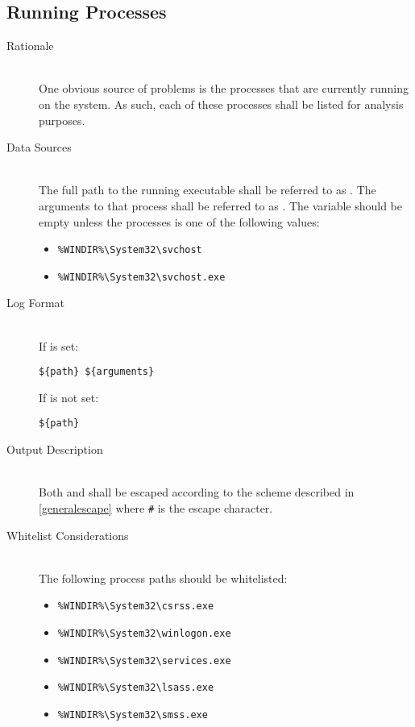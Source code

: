 \subsection{Running Processes}
\begin{description}
\item[Rationale] \hfill \\
One obvious source of problems is the processes that are currently running on
the system.  As such, each of these processes shall be listed for analysis
purposes.  
\item[Data Sources] \hfill \\
The full path to the running executable shall be referred to as .  The
arguments to that process shall be referred to as .  The
 variable should be empty unless the processes is one of the
following values:
\begin{itemize}
  \item \verb|%WINDIR%\System32\svchost|
  \item \verb|%WINDIR%\System32\svchost.exe|
\end{itemize}
\item[Log Format] \hfill \\
If  is set:
\vspace{-\baselineskip}
\begin{verbatim}
${path} ${arguments}
\end{verbatim}
If  is not set:
\vspace{-\baselineskip}
\begin{verbatim}
${path} 
\end{verbatim}
\item[Output Description] \hfill \\
Both  and  shall be escaped according to the scheme
described in \ref{generalescape} where \verb|#| is the escape character.
\item[Whitelist Considerations] \hfill \\
The following process paths should be whitelisted:
\begin{itemize}
  \item \verb|%WINDIR%\System32\csrss.exe|
  \item \verb|%WINDIR%\System32\winlogon.exe|
  \item \verb|%WINDIR%\System32\services.exe|
  \item \verb|%WINDIR%\System32\lsass.exe|
  \item \verb|%WINDIR%\System32\smss.exe|

\end{itemize}
\end{description}
